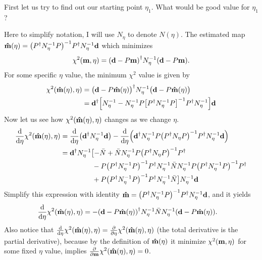 \documentclass[11pt, letterpaper]{article}
\newcommand{\vbd}{\vb{d}}
\newcommand{\vbm}{\vb{m}}
\newcommand{\inv}[1]{#1^{-1}}
\newcommand{\hatm}{\vb{\hat{m}}}
\newcommand{\Pdagger}{P^{\dagger}}
\newcommand{\Nbar}{\bar{N}}
\newcommand{\PPinv}[1]{\inv{\qty(\Pdagger #1 P)}}
\newcommand{\Neta}{N_{\eta}}
\begin{document}
First let us try to find out our starting point $\eta_1$.
What would be good value for $\eta_1$?

Here to simplify notation, I will use $\Neta$ to denote $N(\eta)$.
The estimated map
$\hatm(\eta) = \PPinv{\inv{\Neta}} \Pdagger \inv{\Neta} \vbd$
which minimizes
\begin{align}
\chi^2 (\vbm, \eta)
= \qty(\vbd - P \vbm)^{\dagger} \inv{\Neta} (\vbd - P\vbm).
\label{chi2 eta formula}
\end{align}
For some specific $\eta$ value, the minimum $\chi^2$ value is given by
\begin{align}
\begin{aligned}[b]
\chi^2 (\hatm(\eta), \eta)
&= \qty\big(\vbd - P \hatm(\eta))^{\dagger} \inv{\Neta} 
    \qty\big(\vbd - P\hatm(\eta))
\\
& = \vbd^{\dagger} \qty[\inv{\Neta}
    - \inv{\Neta}P\inv{\qty[
        \Pdagger \inv{\Neta} P
    ]}\Pdagger\inv{\Neta}]\vbd
\end{aligned}
\end{align}
Now let us see how $\chi^2(\hatm(\eta),\eta)$ changes as we change $\eta$.
\begin{align}
\begin{aligned}[b]
\dv{\eta} \chi^2(\hatm(\eta),\eta) 
&= \dv{\eta}(\vbd^{\dagger}\inv{\Neta}\vbd)
    - \dv{\eta}(
        \vbd^{\dagger}\inv{\Neta}P 
        \PPinv{\Neta} 
        \Pdagger \inv{\Neta} \vbd
    )
\\
&= \vbd^{\dagger} \inv{\Neta} \bigl[
    - \Nbar
    + \Nbar \inv{\Neta}P\PPinv{\Neta}\Pdagger
    \\
    &\phantom{= \vbd^{\dagger} \inv{\Neta} \bigl[}
    -P\PPinv{\inv{\Neta}} \Pdagger \inv{\Neta} \Nbar \inv{\Neta}
        P \PPinv{\inv{\Neta}}\Pdagger
    \\
    &\phantom{= \vbd^{\dagger} \inv{N_{\eta}} \bigl[}
    + P \PPinv{\inv{\Neta}} \Pdagger \inv{\Neta} \Nbar
    \big] \inv{\Neta} \vbd
\end{aligned}
\end{align}
Simplify this expression with identity
$\hatm = \PPinv{\inv{\Neta}} \Pdagger \inv{\Neta}\vbd$, and it yields
\begin{align}
\dv{\eta} \chi^2(\hatm(\eta), \eta) 
&= - \qty(\vbd - P\hatm(\eta))^{\dagger} \inv{\Neta} \Nbar \inv{\Neta} 
    (\vbd - P\hatm(\eta)) \label{d chi2}.
\end{align}
Also notice that
$\dv{\eta} \chi^2(\hatm(\eta), \eta) = \pdv{\eta} \chi^2(\hatm(\eta), \eta)$ (the total derivative is the partial derivative),
because by the definition of $\hatm(\eta)$ it minimize
$\chi^2(\vbm, \eta)$ for some fixed $\eta$ value,
implies $\pdv{\vbm} \chi^2(\hatm(\eta), \eta) = 0$.
\end{document}
